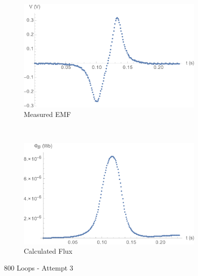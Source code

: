 \documentclass[a4paper]{scrartcl}
\begin{document}
\begin{figure}[p]
    \centering
    \begin{subfigure}[b]{0.45\textwidth}
        \includegraphics[width = \textwidth]{800_3_voltage.png}
        \caption{Measured EMF}
    \end{subfigure}
    ~
    \begin{subfigure}[b]{0.45\textwidth}
        \includegraphics[width = \textwidth]{800_3_flux.png}
        \caption{Calculated Flux}
    \end{subfigure}
    \caption{800 Loops - Attempt 3}
    \label{fig:800_3}
\end{figure}
\end{document}
